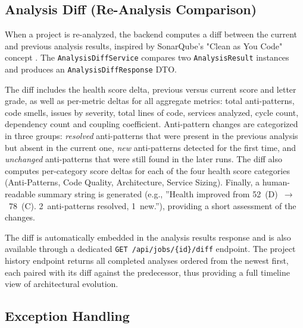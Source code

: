 \subsection{Analysis Diff (Re-Analysis Comparison)}
\label{subsec:analysis-diff}

\par When a project is re-analyzed, the backend computes a diff between the current and previous analysis results, inspired by SonarQube's "Clean as You Code" concept \cite{SonQ}. The \texttt{AnalysisDiffService} compares two \texttt{AnalysisResult} instances and produces an \texttt{AnalysisDiffResponse} DTO.

The diff includes the health score delta, previous versus current score and letter grade, as well as per-metric deltas for all aggregate metrics: total anti-patterns, code smells, issues by severity, total lines of code, services analyzed, cycle count, dependency count and coupling coefficient. Anti-pattern changes are categorized in three groups: \textit{resolved} anti-patterns that were present in the previous analysis but absent in the current one, \textit{new} anti-patterns detected for the first time, and \textit{unchanged} anti-patterns that were still found in the later runs. The diff also computes per-category score deltas for each of the four health score categories (Anti-Patterns, Code Quality, Architecture, Service Sizing). Finally, a human-readable summary string is generated (e.g., ''Health improved from 52~(D)~$\to$~78~(C). 2~anti-patterns resolved, 1~new.''), providing a short assessment of the changes.

The diff is automatically embedded in the analysis results response and is also available through a dedicated \texttt{GET /api/jobs/\{id\}/diff} endpoint. The project history endpoint returns all completed analyses ordered from the newest first, each paired with its diff against the predecessor, thus providing a full timeline view of architectural evolution.

\subsection{Exception Handling}
\label{subsec:exception-handling}

